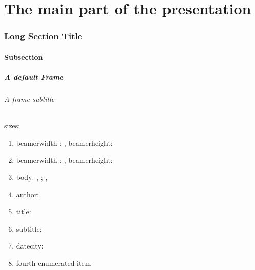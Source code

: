 \documentclass[german,aspectratio=169,titlestyle=white]{tudbeamer}
\begin{document}
% 
%
\part{The main part of the presentation}
\section[ShortSection]{Long Section Title}	
\subsection{Subsection}
\begin{frame}
	\frametitle{A default Frame}
	\framesubtitle{A frame subtitle}

	sizes:
	\begin{enumerate}
		\item beamerwidth : \the\paperwidth, beamerheight: \the\paperheight
		\item beamerwidth : \number\paperwidth, beamerheight:\number\paperheight
		\item body: \the\bodyx, \the\bodyy; \the\bodywidth, \the\bodywidth
		\item author: \insertauthor
		\item title: \inserttitle
		\item subtitle: \insertsubtitle
		\item datecity: \insertdatecity
		\item fourth enumerated item
	\end{enumerate}
\end{frame}
\end{document}
